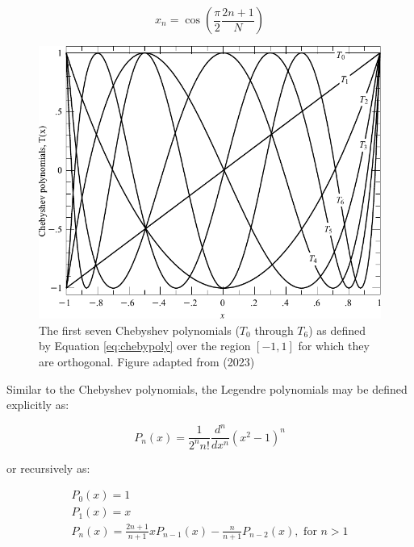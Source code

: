 \begin{equation}
    x_{n} = \cos{\left(  \frac{\pi}{2} \frac{2 n + 1}{N} \right)}
\end{equation}


\begin{figure}[t]
    \centering
    \includegraphics[width = 12cm]{figures/2_chebyshev.pdf}
    \caption{The first seven Chebyshev polynomials ($T_0$ through $T_{6}$) as defined by Equation \ref{eq:chebypoly} over the region $[-1, 1]$ for which they are orthogonal. Figure adapted from \citep{numerical_recipes} (2023)\protect\footnotemark}
    \label{fig:chebyshev}
\end{figure}

Similar to the Chebyshev polynomials, the Legendre polynomials may be defined explicitly as:

\begin{equation}
    P_{n}(x) = \frac{1}{2^{n} n!} \frac{d^{n}}{d x^{n}} (x^{2} - 1)^{n}
    \label{eq:legpolyexplicit}
\end{equation}

\noindent or recursively as:

\begin{gather}
    P_{0}(x) = 1 \nonumber \\
    P_{1}(x) = x \label{eq:legpoly} \\
    P_{n}(x) = \frac{2 n + 1}{n + 1} x P_{n - 1}(x) - \frac{n}{n + 1} P_{n - 2}(x), \text{ for } n > 1 \nonumber
\end{gather}

